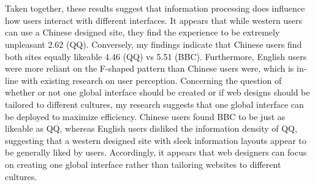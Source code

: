 \\\\
Taken together, these results suggest that information processing does influence how users interact with different interfaces. It appears that while western users can use a Chinese designed site, they find the experience to be extremely unpleasant 2.62 (QQ). Conversely, my findings indicate that Chinese users find both sites equally likeable 4.46 (QQ) vs 5.51 (BBC). Furthermore, English users were more reliant on the F-shaped pattern than Chinese users were, which is in-line with existing research on user perception. Concerning the question of whether or not one global interface should be created or if web designs should be tailored to different cultures, my research suggests that one global interface can be deployed to maximize efficiency. Chinese users found BBC to be just as likeable as QQ, whereas English users disliked the information density of QQ, suggesting that a western designed site with sleek information layouts appear to be generally liked by users. Accordingly, it appears that web designers can focus on creating one global interface rather than tailoring websites to different cultures. 
